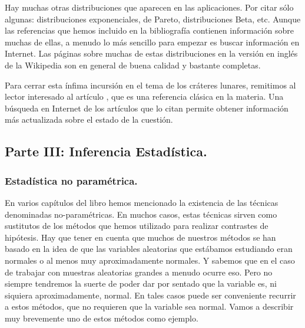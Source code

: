 Hay muchas otras distribuciones que aparecen en las aplicaciones. Por citar sólo algunas: distribuciones exponenciales, de Pareto, distribuciones Beta, etc. Aunque las referencias que hemos incluido en la bibliografía contienen información sobre muchas de ellas, a menudo lo más sencillo para empezar es buscar información en Internet. Las páginas sobre muchas de estas distribuciones en la versión en inglés de la Wikipedia son en general de buena calidad y bastante completas.

Para cerrar esta ínfima incursión en el tema de los cráteres lunares, remitimos al lector interesado al artículo \cite{neukum1975study}, que es una referencia clásica en la materia. Una búsqueda en Internet de los artículos que lo citan permite obtener información más actualizada sobre el estado de la cuestión.

\subsection{Parte III: Inferencia Estadística.}

\subsubsection*{Estadística no paramétrica.}

En varios capítulos del libro hemos mencionado la existencia de las técnicas denominadas no-paramétricas. En muchos casos, estas técnicas sirven como sustitutos de los métodos que hemos utilizado para realizar contrastes de hipótesis. Hay que tener en cuenta que muchos de nuestros métodos se han basado en la idea de que las variables aleatorias que estábamos estudiando eran normales o al menos muy aproximadamente normales. Y sabemos que en el caso de trabajar con muestras aleatorias grandes a menudo ocurre eso. Pero no siempre tendremos la suerte de poder dar por sentado que la variable es, ni siquiera aproximadamente, normal. En tales casos puede ser conveniente recurrir a estos métodos, que no requieren que la variable sea normal. Vamos a describir muy brevemente uno de estos métodos como ejemplo.

